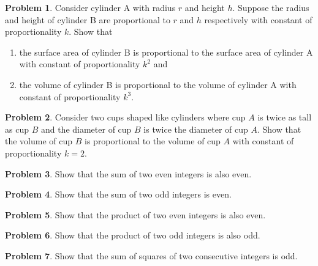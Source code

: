 \documentclass[11pt]{article} %
\theoremstyle{plain}%
\theoremstyle{definition}
\newtheorem{prob}{Problem}
\begin{document}
\begin{prob}
Consider cylinder A with radius $r$ and height $h$. Suppose the radius and height of cylinder B are proportional to $r$ and $h$ respectively with constant of proportionality $k$. Show that 

\begin{enumerate}[leftmargin=.5cm,itemindent=.5cm,labelwidth=\itemindent,labelsep=0cm,align=left,label=\alph*),ref=\alph*]
	\item the surface area of cylinder B is proportional to the surface area of cylinder A with constant of proportionality $k^2$ and 
	\item the volume of cylinder B is proportional to the volume of cylinder A with constant of proportionality $k^3$.
\end{enumerate}
\end{prob}




\begin{prob}
Consider two cups shaped like cylinders where cup $A$ is twice as tall as cup $B$ and the diameter of cup $B$ is twice the diameter of cup $A$. Show that the volume of cup $B$ is proportional to the volume of cup $A$ with constant of proportionality $k = 2$.
\end{prob}


\begin{prob}
Show that the sum of two even integers is also even.
\end{prob}





\begin{prob}
Show that the sum of two odd integers is even.
\end{prob}



\begin{prob}
Show that the product of two even integers is also even.
\end{prob}



\begin{prob}
Show that the product of two odd integers is also odd.
\end{prob}



\begin{prob}
Show that the sum of squares of two consecutive integers is odd.
\end{prob}
\end{document}
